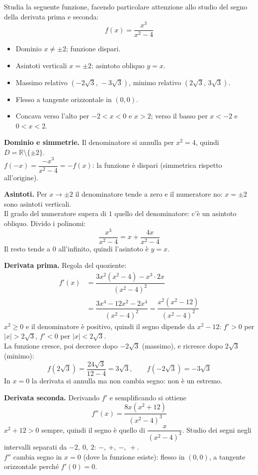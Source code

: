 \begin{question}[ID=3.1, subtitle={Studio di $f(x) = x^3/(x^2-4)$ con derivate}, tags={derivate, studio di funzione}, difficulty=difficile]
Studia la seguente funzione, facendo particolare attenzione allo studio del segno della derivata prima e seconda:
\begin{equation*}
    f(x) = \frac{x^3}{x^2-4}
\end{equation*}
\begin{solution}
\begin{itemize}
    \item Dominio $x\neq\pm2$; funzione dispari.
    \item Asintoti verticali $x=\pm2$; asintoto obliquo $y=x$.
    \item Massimo relativo $\left(-2\sqrt3,\,-3\sqrt3\right)$, minimo relativo $\left(2\sqrt3,\,3\sqrt3\right)$.
    \item Flesso a tangente orizzontale in $(0,0)$.
    \item Concava verso l'alto per $-2<x<0$ e $x>2$; verso il basso per $x<-2$ e $0<x<2$.
\end{itemize}
\end{solution}
\begin{explanation}
\textbf{Dominio e simmetrie.} Il denominatore si annulla per $x^2=4$, quindi $D=\mathbb{R}\setminus\{\pm2\}$. \\
$f(-x)=\dfrac{-x^3}{x^2-4}=-f(x)$: la funzione è dispari (simmetrica rispetto all'origine).

\textbf{Asintoti.} Per $x\to\pm2$ il denominatore tende a zero e il numeratore no: $x=\pm2$ sono asintoti verticali. \\
Il grado del numeratore supera di $1$ quello del denominatore: c'è un asintoto obliquo. Divido i polinomi:
\[ \dfrac{x^3}{x^2-4}=x+\dfrac{4x}{x^2-4} \]
Il resto tende a $0$ all'infinito, quindi l'asintoto è $y=x$.

\textbf{Derivata prima.} Regola del quoziente:
\[\begin{aligned}
f'(x) &= \dfrac{3x^2(x^2-4)-x^3\cdot2x}{(x^2-4)^2}\\
&= \dfrac{3x^4-12x^2-2x^4}{(x^2-4)^2}=\dfrac{x^2(x^2-12)}{(x^2-4)^2}
\end{aligned}\]
$x^2\geq0$ e il denominatore è positivo, quindi il segno dipende da $x^2-12$: $f'>0$ per $|x|>2\sqrt3$, $f'<0$ per $|x|<2\sqrt3$. \\
La funzione cresce, poi decresce dopo $-2\sqrt3$ (massimo), e ricresce dopo $2\sqrt3$ (minimo):
\[ f(2\sqrt3)=\dfrac{24\sqrt3}{12-4}=3\sqrt3, \qquad f(-2\sqrt3)=-3\sqrt3 \]
In $x=0$ la derivata si annulla ma non cambia segno: non è un estremo.

\textbf{Derivata seconda.} Derivando $f'$ e semplificando si ottiene
\[ f''(x)=\dfrac{8x(x^2+12)}{(x^2-4)^3} \]
$x^2+12>0$ sempre, quindi il segno è quello di $\dfrac{x}{(x^2-4)^3}$. Studio dei segni negli intervalli separati da $-2,\ 0,\ 2$: $-,\ +,\ -,\ +$. \\
$f''$ cambia segno in $x=0$ (dove la funzione esiste): flesso in $(0,0)$, a tangente orizzontale perché $f'(0)=0$.
\end{explanation}
\end{question}

